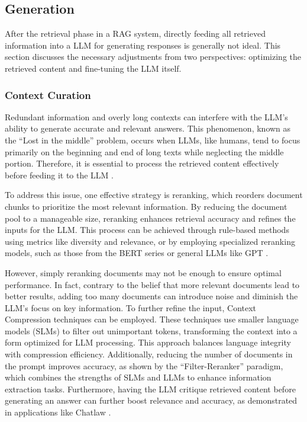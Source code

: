 \subsection{Generation}

After the retrieval phase in a RAG system, directly feeding all retrieved information into a LLM for generating responses is generally not ideal. This section discusses the necessary adjustments from two perspectives: optimizing the retrieved content and fine-tuning the LLM itself.

\subsubsection{Context Curation}

Redundant information and overly long contexts can interfere with the LLM’s ability to generate accurate and relevant answers. This phenomenon, known as the “Lost in the middle” problem, occurs when LLMs, like humans, tend to focus primarily on the beginning and end of long texts while neglecting the middle portion. Therefore, it is essential to process the retrieved content effectively before feeding it to the LLM \cite{liu2024lost}.

To address this issue, one effective strategy is reranking, which reorders document chunks to prioritize the most relevant information. By reducing the document pool to a manageable size, reranking enhances retrieval accuracy and refines the inputs for the LLM. This process can be achieved through rule-based methods using metrics like diversity and relevance, or by employing specialized reranking models, such as those from the BERT series or general LLMs like GPT \cite{gao2023chat}.

However, simply reranking documents may not be enough to ensure optimal performance. In fact, contrary to the belief that more relevant documents lead to better results, adding too many documents can introduce noise and diminish the LLM’s focus on key information. To further refine the input, Context Compression techniques can be employed. These techniques use smaller language models (SLMs) to filter out unimportant tokens, transforming the context into a form optimized for LLM processing. This approach balances language integrity with compression efficiency. Additionally, reducing the number of documents in the prompt improves accuracy, as shown by the “Filter-Reranker” paradigm, which combines the strengths of SLMs and LLMs to enhance information extraction tasks. Furthermore, having the LLM critique retrieved content before generating an answer can further boost relevance and accuracy, as demonstrated in applications like Chatlaw \cite{gao2023retrieval, cui2023chatlaw}.

